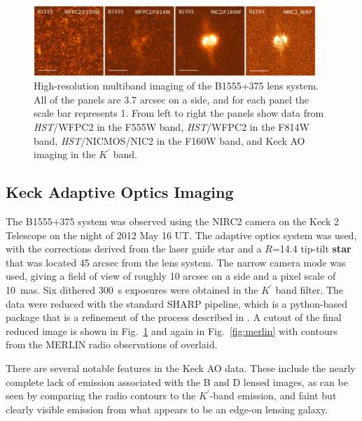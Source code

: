 \documentclass[useAMS,usenatbib]{mn2e}
\begin{document}
\begin{figure}
\includegraphics[width=0.95\textwidth]{B1555_gallery.eps}
\caption{High-resolution multiband imaging of the B1555+375 lens system.
All of the panels are 3.7 arcsec on a side, and for each panel the scale bar 
represents 1\arcsec.  From left to right the panels show data from
\textit{HST}/WFPC2 in the F555W band, \textit{HST}/WFPC2 in the F814W band, \textit{HST}/NICMOS/NIC2
in the F160W band, and Keck AO imaging in the $K^\prime$ band.
\label{fig:multiband}}
%

\end{figure}

\subsection{Keck Adaptive Optics Imaging}

The B1555+375 system was observed using the NIRC2 camera on the Keck 2
Telescope on the night of 2012 May 16 UT.  The adaptive optics system
was used, with the corrections derived from the laser guide star and a
$R$=14.4 tip-tilt \textbf{star} that was located 45 arcsec from the lens
system.  The narrow camera mode was used, giving a field of view
of roughly 10 arcsec on a side and a pixel scale of 10~mas.
Six dithered 300~s exposures were obtained in the $K^{\prime}$ band filter.  The
data were reduced with the standard SHARP pipeline, which is a
python-based package that is a refinement of the process described in
\citet{Auger_EELS1}.  A cutout of the final reduced image is shown in
Fig.~\ref{fig:multiband} and again in Fig.~\ref{fig:merlin} with
contours from the MERLIN radio observations of \citet{Marlow99}
overlaid.  

There are several notable features in the Keck AO data.
These include the nearly complete lack of emission associated with the
B and D lensed images, as can be seen by comparing the radio contours
to the $K^\prime$-band emission, and faint but clearly visible
emission from what appears to be an edge-on lensing galaxy.
\end{document}
